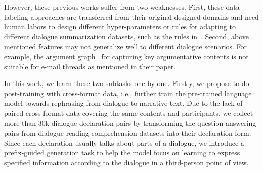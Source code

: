 However, these previous works suffer from two weaknesses. 
First, these data labeling approaches are transferred from their original designed domains and need human labors to design different hyper-parameters or rules for adapting to different dialogue summarization datasets, such as the
rules in~\citet{liu2021coreference}.
Second, above mentioned features may not generalize well to different dialogue scenarios. For example, the argument graph~\cite{fabbri2021convosumm} for capturing key argumentative contents is not suitable for e-mail threads as mentioned in their paper. %



In this work, we learn these two subtasks one by one.
Firstly, we propose to do post-training with cross-format data, i.e., further train the pre-trained language model towards rephrasing from dialogue to narrative text.
Due to the lack of paired cross-format data covering the same contents and participants, we collect more than 30k dialogue-declaration pairs by transforming the question-answering pairs from dialogue reading comprehension datasets into their declaration form. Since each declaration usually talks about parts of a dialogue, we introduce a prefix-guided generation task to help the model focus on learning to express specified information according to the dialogue in a third-person point of view.
